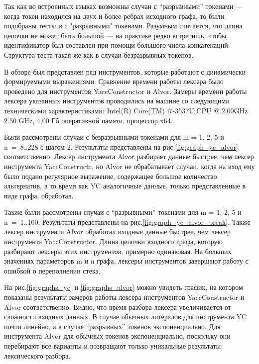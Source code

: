 \documentclass{matmex-diploma}
\begin{document}
Так как во встроенных языках возможны случаи с “разрывными” токенами --- когда токен находился на двух и более ребрах исходного графа, то были подобраны тесты и 
с "разрывными" токенами. Разумным считается, что длина цепочки не может быть большой --- на практике редко встретишь, чтобы идентификатор был составлен при помощи
большого числа конкатенаций. Структура теста такая же как в случаи безразрывных токенов. 

В обзоре был представлен ряд инструментов, которые работают с динамически формируемыми выражениями. Сравнение времени работы лексера было проведено
для инструментов YaccConstructor и Alvor. Замеры времени работы лексера указанных инструментов проводились на машине со следующими техническими характеристиками:
Intel(R) Core(TM) i7-3537U CPU @ 2.00GHz 2.50 GHz, 4,00 Гб оперативной памяти, процессор x64.

Были рассмотрены случаи с безразрывными токенами для m = 1, 2, 5 и n~=~8..228 с шагом 2. Результаты представлены на рис.\ref{fig:graph_yc_alvor}
соответственно. Лексер инструмента Alvor разбирает данные быстрее, чем лексер инструмента YaccConstructr, но Alvor не обрабатывает случаи, когда на вход ему 
было подано регулярное выражение, содержащее большое количество альтернатив, в то  время как YC аналогичные данные, только представленные 
в виде графа,  обработал. 

Также были рассмотрены случаи с “разрывными” токенами для m = 1, 2, 5 и n~=~1..100. Результаты представлены на  рис.\ref{fig:graph_yc_alvor_break}. 
Также лексер инструмента Alvor обработал входные данные быстрее, чем лексер инструмента YaccConstructor. Длина цепочки входного графа, которую разбирают лексеры этих инструментов, примерно одинаковая. 
На больших значениях параметоров m и n графа, лексеры инструментов завершают работу с ошибкой о переполнении стека. 

На рис.\ref{fig:graphs_yc} и  \ref{fig:graphs_alvor} можно увидеть график, 
на котором показаны результаты замеров работы лексера инструментов YaccConstructor и Alvor соответственно. 
Видно, что время разбора лексера увеличивается от сложности входных данных. В случае обычных литералов для инструмента YC почти линейно, а в случае 
“разрывных” токенов экспоненциально. Для инструмента Alvor для обычных токенов экспоненциально, поскольку они перебирают все варианты и возвращают 
только уникальные результаты лексического разбора. 
\end{document}
